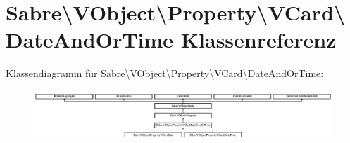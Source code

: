 \hypertarget{class_sabre_1_1_v_object_1_1_property_1_1_v_card_1_1_date_and_or_time}{}\section{Sabre\textbackslash{}V\+Object\textbackslash{}Property\textbackslash{}V\+Card\textbackslash{}Date\+And\+Or\+Time Klassenreferenz}
\label{class_sabre_1_1_v_object_1_1_property_1_1_v_card_1_1_date_and_or_time}
Klassendiagramm für Sabre\textbackslash{}V\+Object\textbackslash{}Property\textbackslash{}V\+Card\textbackslash{}Date\+And\+Or\+Time\+:\begin{figure}[H]
\begin{center}
\leavevmode
\includegraphics[height=1.917808cm]{class_sabre_1_1_v_object_1_1_property_1_1_v_card_1_1_date_and_or_time}
\end{center}
\end{figure}
